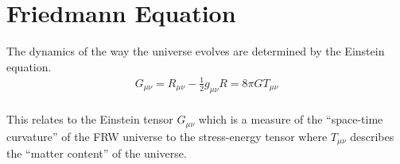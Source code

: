 \section{Friedmann Equation}
\hspace{0.5cm}The dynamics of the way the universe evolves are determined by the Einstein equation.
\begin{align}
    G_{\mu \nu } = R_{\mu \nu } - \frac{1}{2} g_{\mu \nu } R = 8 \pi G T_{\mu \nu }\label{eq:1.10}
\end{align}\\
This relates to the Einstein tensor $G_{\mu \nu }$ which is a measure of the “space-time curvature” of the FRW
universe to the stress-energy tensor where $T_{\mu \nu }$ describes the “matter content” of the universe.\\

